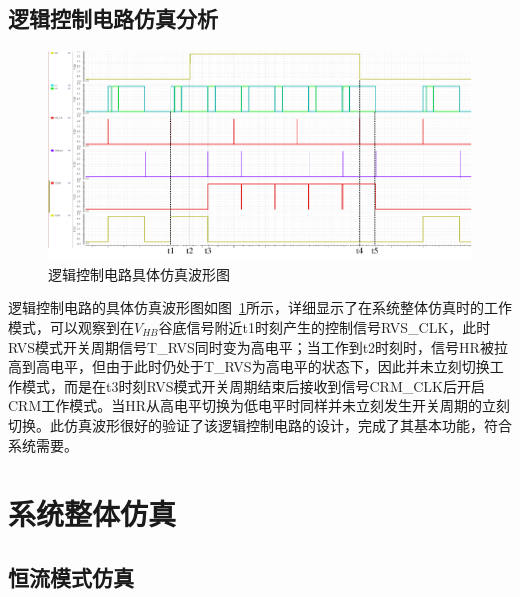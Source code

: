 \subsection{逻辑控制电路仿真分析}

\begin{figure}[htbp] 
    \centering
    \includegraphics[width=0.8\linewidth]{figures/逻辑控制波形2.pdf}
    \caption{逻辑控制电路具体仿真波形图}
    \label{fig:逻辑控制波形2}
\end{figure} 

逻辑控制电路的具体仿真波形图如图~\ref{fig:逻辑控制波形2}所示，详细显示了在系统整体仿真时的工作模式，可以观察到在$V_{HB}$谷底信号附近t1时刻产生的控制信号RVS\_CLK，此时RVS模式开关周期信号T\_RVS同时变为高电平；当工作到t2时刻时，信号HR被拉高到高电平，但由于此时仍处于T\_RVS为高电平的状态下，因此并未立刻切换工作模式，而是在t3时刻RVS模式开关周期结束后接收到信号CRM\_CLK后开启CRM工作模式。当HR从高电平切换为低电平时同样并未立刻发生开关周期的立刻切换。此仿真波形很好的验证了该逻辑控制电路的设计，完成了其基本功能，符合系统需要。


%

\section{系统整体仿真}


\subsection{恒流模式仿真}

